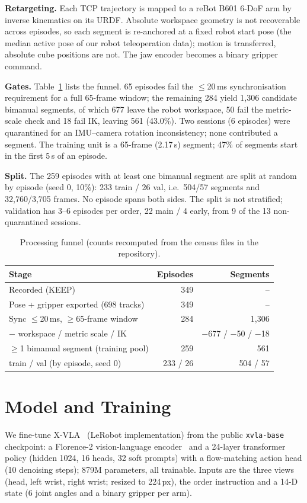\documentclass[conference,10pt]{IEEEtran}
\begin{document}
\textbf{Retargeting.} Each TCP trajectory is mapped to a reBot B601 6-DoF arm by inverse kinematics on its URDF. Absolute
workspace geometry is not recoverable across episodes, so each segment is re-anchored at a fixed robot start pose (the median
active pose of our robot teleoperation data); motion is transferred, absolute cube positions are not. The jaw encoder becomes a
binary gripper command.

\textbf{Gates.} Table~\ref{tab:funnel} lists the funnel. 65 episodes fail the $\le$20\,ms synchronisation requirement for a full
65-frame window; the remaining 284 yield 1{,}306 candidate bimanual segments, of which 677 leave the robot workspace, 50 fail the
metric-scale check and 18 fail IK, leaving 561 (43.0\%). Two sessions (6 episodes) were quarantined for an IMU--camera
rotation inconsistency; none contributed a segment. The training unit is a 65-frame (2.17\,s) segment; 47\% of segments start
in the first 5\,s of an episode.

\textbf{Split.} The 259 episodes with at least one bimanual segment are split at random by episode (seed 0, 10\%): 233 train /
26 val, i.e.\ 504/57 segments and 32{,}760/3{,}705 frames. No episode spans both sides. The split is not stratified; validation
has 3--6 episodes per order, 22 main / 4 early, from 9 of the 13 non-quarantined sessions.

\begin{table}[t]
\centering\footnotesize
\caption{Processing funnel (counts recomputed from the census files in the repository).}
\label{tab:funnel}
\setlength{\tabcolsep}{4pt}\begin{tabular}{@{}lrr@{}}
\toprule
Stage & Episodes & Segments \\
\midrule
Recorded (KEEP) & 349 & -- \\
Pose + gripper exported (698 tracks) & 349 & -- \\
Sync $\le$20\,ms, $\ge$65-frame window & 284 & 1{,}306 \\
\quad $-$ workspace / metric scale / IK & & $-$677 / $-$50 / $-$18 \\
$\ge$1 bimanual segment (training pool) & 259 & 561 \\
\quad train / val (by episode, seed 0) & 233 / 26 & 504 / 57 \\
\bottomrule
\end{tabular}
\end{table}

\section{Model and Training}\label{sec:model}
We fine-tune X-VLA~\cite{zheng2025xvla} (LeRobot implementation) from the public \texttt{xvla-base} checkpoint: a Florence-2
vision-language encoder~\cite{xiao2024florence2} and a 24-layer transformer policy (hidden 1024, 16 heads, 32 soft prompts) with a
flow-matching action head (10 denoising steps); 879M parameters, all trainable. Inputs are the three views (head, left wrist,
right wrist; resized to 224\,px), the order instruction and a 14-D state (6 joint angles and a binary gripper per arm).
\end{document}
